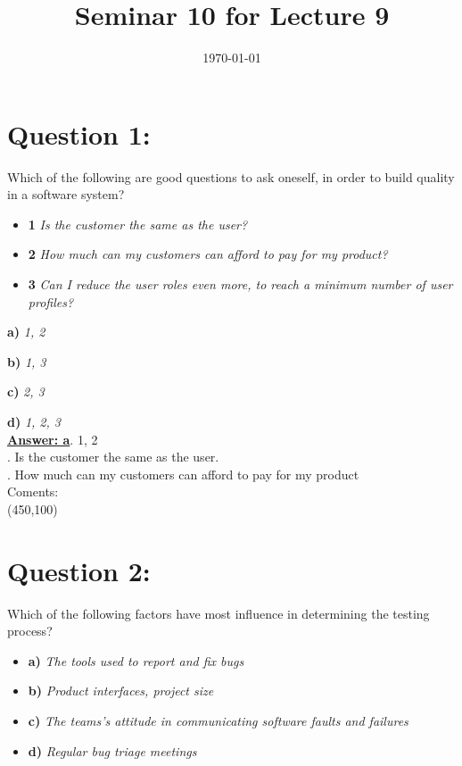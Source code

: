 \documentclass[12pt,a4paper,norsk]{article}
\title{Seminar 10 for Lecture 9}
\author{}
\date{\today}
\begin{document}
\maketitle
\noindent \section {Question 1:}Which of the following are good questions to ask oneself, in order to build quality
in a software system?\\

\begin{itemize}
 \item \textbf{1} \textit{ Is the customer the same as the user?}
 \item \textbf{2} \textit{ How much can my customers can afford to pay for my product?}
 \item \textbf{3} \textit{ Can I reduce the user roles even more, to reach a minimum number of user profiles?}
\end{itemize}

 \item \textbf{a)} \textit{1, 2}
 \item \textbf{b)} \textit{1, 3}
 \item \textbf{c)} \textit{2, 3}
 \item \textbf{d)} \textit{1, 2, 3}\\
 
\underline {\textbf{Answer: a}}. 1, 2 \\
. Is the customer the same as the user.\\
. How much can my customers can afford to pay for my product\\
\noindent Coments:\\
\framebox(450,100){}\\

\noindent \section{ Question 2:} Which of the following factors have most influence in determining the testing process?\\

\begin{itemize}
 \item \textbf{a)} \textit{The tools used to report and fix bugs}
 \item \textbf{b)} \textit{Product interfaces, project size}
 \item \textbf{c)} \textit{The teams's attitude in communicating software faults and failures}
 \item \textbf{d)} \textit{Regular bug triage meetings}
\end{itemize}
\end{document}
